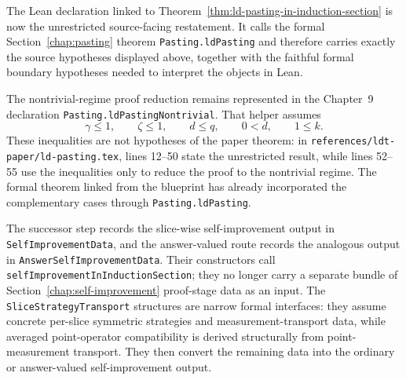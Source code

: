 \begin{remark}\label{rem:ld-pasting-induction-unrestricted-lean-form}
	The Lean declaration linked to
	Theorem~\ref{thm:ld-pasting-in-induction-section} is now the unrestricted
	source-facing restatement.  It calls the formal Section~\ref{chap:pasting}
	theorem \texttt{Pasting.ldPasting} and therefore carries exactly the source
	hypotheses displayed above, together with the faithful formal boundary
	hypotheses needed to interpret the objects in Lean.

	The nontrivial-regime proof reduction remains represented in the Chapter~9
	declaration \texttt{Pasting.ldPastingNontrivial}.  That helper assumes
	\[
		\gamma \le 1,\qquad \zeta \le 1,\qquad d \le q,\qquad 0<d,\qquad 1\le k.
	\]
	These inequalities are not hypotheses of the paper theorem: in
	\texttt{references/ldt-paper/ld-pasting.tex}, lines 12--50 state the
	unrestricted result, while lines 52--55 use the inequalities only to reduce
	the proof to the nontrivial regime.  The formal theorem linked from the
	blueprint has already incorporated the complementary cases through
	\texttt{Pasting.ldPasting}.
\end{remark}

\begin{remark}\label{rem:self-improvement-slice-transport}
	The successor step records the slice-wise self-improvement output in
	\texttt{SelfImprovementData}, and the answer-valued route records the analogous
	output in \texttt{AnswerSelfImprovementData}.  Their constructors call
	\texttt{selfImprovementInInductionSection}; they no longer carry a separate
	bundle of Section~\ref{chap:self-improvement} proof-stage data as an input.
	The \texttt{SliceStrategyTransport} structures are narrow formal interfaces: they
	assume concrete per-slice symmetric strategies and measurement-transport data,
	while averaged point-operator compatibility is derived structurally from
	point-measurement transport.  They then convert the remaining data into the
	ordinary or answer-valued self-improvement output.
\end{remark}

